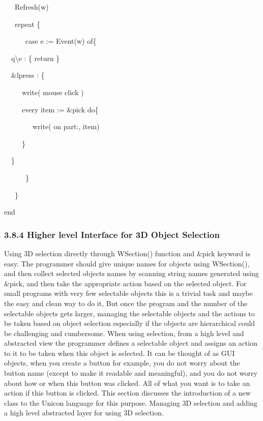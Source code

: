 \documentclass[letterpaper]{article}
\begin{document}
{{\sffamily
\ \ \ Refresh(w)}

{\sffamily
\ \ \ repeat \{}

{\sffamily
\ \ \ \ \ \ case e := Event(w) of\{}

{\sffamily
\ \  {\textquotedbl}q{\textquotedbl}{\textbar}{\textquotedbl}{\textbackslash}e{\textquotedbl} : \{ return \}
\ \ \ \ \ \ \ \ \ }

{\sffamily
\ \  \&lpress : \{\  \ }

{\sffamily
\ \  \ \ \ write({\textquotedbl} mouse click{\textquotedbl} )}

{\sffamily
\ \  \ \ \ every item := \&pick do\{}

{\sffamily
\ \  \ \ \ \ \ \ write( {\textquotedbl}on part:{\textquotedbl}, item)}

{\sffamily
\ \  \ \ \ \}}

{\sffamily
\ \  \}}

{\sffamily
\ \ \ \ \ \ \}}

{\sffamily
\ \ \ \}}

{\sffamily
end}


\subsubsection[3.8.4 Higher level Interface for 3D Object Selection]{3.8.4 Higher level Interface for 3D Object Selection}

Using 3D selection directly through \textsf{WSection()} function and
\textsf{\&}\textsf{pick} keyword is easy. The programmer should give
unique names for objects using \textsf{WSection}\textsf{()}, and then
collect selected objects names by scanning string names generated
using \textsf{\&pick}, and then take the appropriate action based on
the selected object. For small programs with very few selectable
objects this is a trivial task and maybe the easy and clean way to do
it, But once the program and the number of the selectable objects gets
larger, managing the selectable objects and the actions to be taken
based on object selection especially if the objects are hierarchical
could be challenging and cumbersome. When using selection, from a high
level and abstracted view the programmer defines a selectable object
and assigns an action to it to be taken when this object is
selected. It can be thought of as GUI objects, when you create a
button for example, you do not worry about the button name (except to
make it readable and meaningful), and you do not worry about how or
when this button was clicked. All of what you want is to take an
action if this button is clicked. This section discusses the
introduction of a new class to the Unicon language for this
purpose. Managing 3D selection and adding a high level abstracted
layer for using 3D selection.

}
\end{document}
